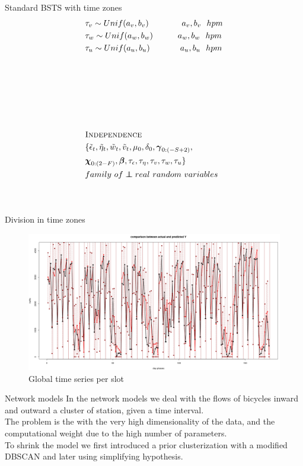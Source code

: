 \documentclass{beamer}
\newcommand\independent{\protect\mathpalette{\protect\independenT}{\perp}}
\def\independenT#1#2{\mathrel{\rlap{$#1#2$}\mkern2mu{#1#2}}}
\begin{document}
\begin{frame}{Standard BSTS with time zones}
\begin{equation*}
\begin{aligned}[c]
&\tau_v \sim Unif(a_v, b_v)\quad\quad\quad \quad a_v, b_v\ \ hpm\\
&\tau_w\sim Unif(a_w, b_w)\quad\quad\quad a_w, b_w\ \ hpm\\
&\tau_u\sim Unif(a_u, b_u)\quad\quad\quad\ \ a_u, b_u\ \ hpm\\
&\\
&\\
&\\
&\\
&\\
&\\
&\textsc{Independence}\\
&\{\tilde{\epsilon}_t, \tilde{\eta}_t, \tilde{w}_t, \tilde{v}_t, \mu_0, \delta_0, \boldsymbol{\gamma}_{0:(-S+2)}, \\&\boldsymbol{\chi}_{0:(2-F)}, \boldsymbol{\beta}, \tau_\epsilon, \tau_\eta, \tau_v, \tau_w, \tau_u \}\\ &family\ of \independent real\ random\ variables\\
&\\
&\\
\end{aligned}
\end{equation*}
\end{frame}

\begin{frame}{Division in time zones}
\begin{figure}[H]
	\centering
\includegraphics[width=100 mm]{pictures/Time_series.png}
\caption{Global time series per slot}
\label{fig:time series}
\end{figure}
\end{frame}

\begin{frame}{Network models}
In the network models we deal with the \alert{flows} of bicycles inward and outward a cluster of station, given a time interval.\\

The problem is the with the very high dimensionality of the data, and the computational weight due to the high number of parameters.\\

To shrink the model we first introduced a prior clusterization with a modified \alert{DBSCAN} and later using simplifying hypothesis. 
\end{frame}
\end{document}
